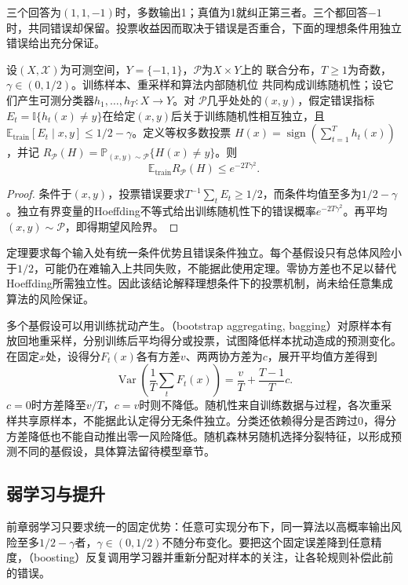 三个回答为$(1,1,-1)$时，多数输出1；真值为1就纠正第三者。三个都回答$-1$时，共同错误却保留。投票收益因而取决于错误是否重合，下面的理想条件用独立错误给出充分保证。

\begin{theorem}[独立错误下的多数投票]
\label{thm:independent-majority-vote}
设$(X,\mathcal X)$为可测空间，$Y=\{-1,1\}$，$\mathcal P$为$X\times Y$上的
联合分布，$T\geq1$为奇数，$\gamma\in(0,1/2)$。训练样本、重采样和算法内部随机位
共同构成训练随机性；设它们产生可测分类器$h_1,\ldots,h_T:X\to Y$。对
$\mathcal P$几乎处处的$(x,y)$，假定错误指标
$E_t=\mathbb I\{h_t(x)\neq y\}$在给定$(x,y)$后关于训练随机性相互独立，且
$\mathbb E_{\mathrm{train}}[E_t\mid x,y]\leq1/2-\gamma$。定义等权多数投票
$H(x)=\operatorname{sign}(\sum_{t=1}^T h_t(x))$，并记
$R_{\mathcal P}(H)=\mathbb P_{(x,y)\sim\mathcal P}\{H(x)\neq y\}$。则
\[
 \mathbb E_{\mathrm{train}}R_{\mathcal P}(H)\leq e^{-2T\gamma^2}.
\]
\end{theorem}

\begin{proof}
条件于$(x,y)$，投票错误要求$T^{-1}\sum_tE_t\geq1/2$，而条件均值至多为$1/2-\gamma$。独立有界变量的Hoeffding不等式给出训练随机性下的错误概率$e^{-2T\gamma^2}$。再平均$(x,y)\sim\mathcal P$，即得期望风险界。
\end{proof}

定理要求每个输入处有统一条件优势且错误条件独立。每个基假设只有总体风险小于$1/2$，可能仍在难输入上共同失败，不能据此使用定理。零协方差也不足以替代Hoeffding所需独立性。因此该结论解释理想条件下的投票机制，尚未给任意集成算法的风险保证。

多个基假设可以用训练扰动产生。（bootstrap aggregating, bagging）对原样本有放回地重采样，分别训练后平均得分或投票，试图降低样本扰动造成的预测变化。在固定$x$处，设得分$F_t(x)$各有方差$v$、两两协方差为$c$，展开平均值方差得到
\[
 \operatorname{Var}\!\left(\frac1T\sum_tF_t(x)\right)
 =\frac{v}{T}+\frac{T-1}{T}c.
\]
$c=0$时方差降至$v/T$，$c=v$时则不降低。随机性来自训练数据与过程，各次重采样共享原样本，不能据此认定得分无条件独立。分类还依赖得分是否跨过0，得分方差降低也不能自动推出零一风险降低。随机森林另随机选择分裂特征，以形成预测不同的基假设，具体算法留待模型章节。

\subsection{弱学习与提升}

前章弱学习只要求统一的固定优势：任意可实现分布下，同一算法以高概率输出风险至多$1/2-\gamma$者，$\gamma\in(0,1/2)$不随分布变化。要把这个固定误差降到任意精度，（boosting）反复调用学习器并重新分配对样本的关注，让各轮规则补偿此前的错误。

